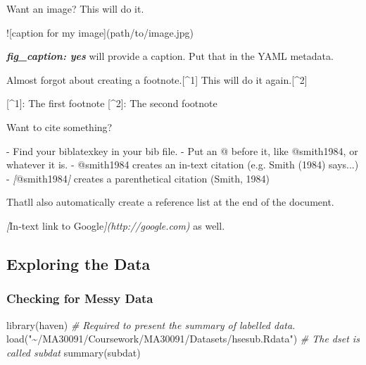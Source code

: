 \documentclass[
  11pt,
]{article}
\newenvironment{Shaded}{\begin{snugshade}}{\end{snugshade}}
\newcommand{\AlertTok}[1]{\textcolor[rgb]{0.94,0.16,0.16}{#1}}
\newcommand{\CommentTok}[1]{\textcolor[rgb]{0.56,0.35,0.01}{\textit{#1}}}
\newcommand{\FunctionTok}[1]{\textcolor[rgb]{0.00,0.00,0.00}{#1}}
\newcommand{\InformationTok}[1]{\textcolor[rgb]{0.56,0.35,0.01}{\textbf{\textit{#1}}}}
\newcommand{\NormalTok}[1]{#1}
\newcommand{\OtherTok}[1]{\textcolor[rgb]{0.56,0.35,0.01}{#1}}
\newcommand{\SpecialStringTok}[1]{\textcolor[rgb]{0.31,0.60,0.02}{#1}}
\newcommand{\StringTok}[1]{\textcolor[rgb]{0.31,0.60,0.02}{#1}}
\begin{document}
\begin{Shaded}
\begin{Highlighting}[]
\NormalTok{Want an image? This will do it.}

\AlertTok{![caption for my image](path/to/image.jpg)}

\InformationTok{\textasciigrave{}fig\_caption: yes\textasciigrave{}}\NormalTok{ will provide a caption. Put that in the YAML metadata.}

\NormalTok{Almost forgot about creating a footnote.}\OtherTok{[\^{}1]}\NormalTok{ This will do it again.}\OtherTok{[\^{}2]}

\OtherTok{[\^{}1]: }\NormalTok{The first footnote}
\OtherTok{[\^{}2]: }\NormalTok{The second footnote}

\NormalTok{Want to cite something? }

\SpecialStringTok{{-} }\NormalTok{Find your biblatexkey in your bib file.}
\SpecialStringTok{{-} }\NormalTok{Put an @ before it, like @smith1984, or whatever it is.}
\SpecialStringTok{{-} }\NormalTok{@smith1984 creates an in{-}text citation (e.g. Smith (1984) says...)}
\SpecialStringTok{{-} }\CommentTok{[}\OtherTok{@smith1984}\CommentTok{]}\NormalTok{ creates a parenthetical citation (Smith, 1984)}

\NormalTok{That\textquotesingle{}ll also automatically create a reference list at the end of the document.}

\CommentTok{[}\OtherTok{In{-}text link to Google}\CommentTok{](http://google.com)}\NormalTok{ as well.}
\end{Highlighting}
\end{Shaded}

\hypertarget{exploring-the-data}{%
\subsection{Exploring the Data}\label{exploring-the-data}}

\hypertarget{checking-for-messy-data}{%
\subsubsection{Checking for Messy Data}\label{checking-for-messy-data}}

\begin{Shaded}
\begin{Highlighting}[]
\FunctionTok{library}\NormalTok{(haven) }\CommentTok{\# Required to present the summary of labelled data.}
\FunctionTok{load}\NormalTok{(}\StringTok{"\textasciitilde{}/MA30091/Coursework/MA30091/Datasets/hsesub.Rdata"}\NormalTok{) }\CommentTok{\# The dset is called subdat}
\FunctionTok{summary}\NormalTok{(subdat)}
\end{Highlighting}
\end{Shaded}
\end{document}

